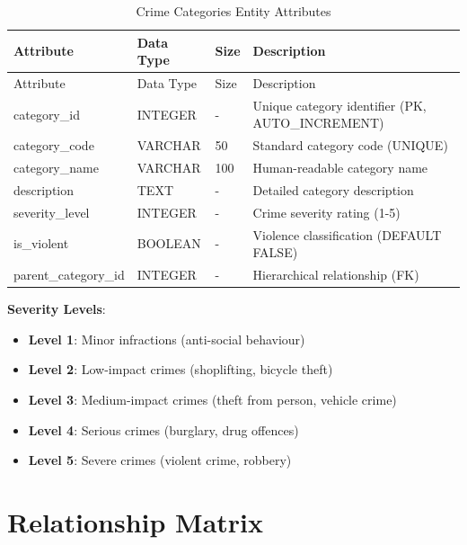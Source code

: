 \documentclass[12pt,a4paper]{article}
\begin{document}
\begin{longtable}{@{}lllp{6cm}@{}}
\caption{Crime Categories Entity Attributes} \\
\toprule
Attribute & Data Type & Size & Description \\
\midrule
\endfirsthead
\toprule
Attribute & Data Type & Size & Description \\
\midrule
\endhead
category\_id & INTEGER & - & Unique category identifier (PK, AUTO\_INCREMENT) \\
category\_code & VARCHAR & 50 & Standard category code (UNIQUE) \\
category\_name & VARCHAR & 100 & Human-readable category name \\
description & TEXT & - & Detailed category description \\
severity\_level & INTEGER & - & Crime severity rating (1-5) \\
is\_violent & BOOLEAN & - & Violence classification (DEFAULT FALSE) \\
parent\_category\_id & INTEGER & - & Hierarchical relationship (FK) \\
\bottomrule
\end{longtable}

\textbf{Severity Levels}:
\begin{itemize}
    \item \textbf{Level 1}: Minor infractions (anti-social behaviour)
    \item \textbf{Level 2}: Low-impact crimes (shoplifting, bicycle theft)
    \item \textbf{Level 3}: Medium-impact crimes (theft from person, vehicle crime)
    \item \textbf{Level 4}: Serious crimes (burglary, drug offences)
    \item \textbf{Level 5}: Severe crimes (violent crime, robbery)
\end{itemize}

\section{Relationship Matrix}
\end{document}
